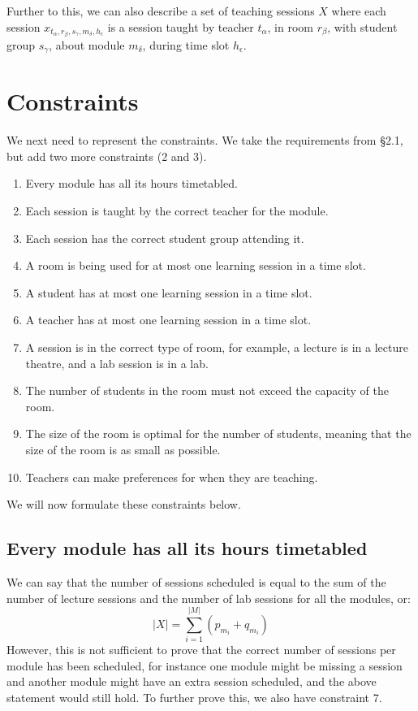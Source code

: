 \documentclass[a4paper, 12pt]{report}
\begin{document}
Further to this, we can also describe a set of teaching sessions \( X \) where 
each session \( x_{t_{\alpha},r_{\beta},s_{\gamma},m_{\delta},h_{\epsilon}} \) 
is a session taught by teacher \( t_{\alpha} \), in room \( r_{\beta} \), with 
student group \( s_{\gamma} \), about module \( m_{\delta} \), during time slot
\( h_{\epsilon} \).

\section{Constraints}

We next need to represent the constraints. We take the requirements from \S 2.1,
but add two more constraints (2 and 3).
\begin{enumerate}
	\item Every module has all its hours timetabled.
	\item Each session is taught by the correct teacher for the module.
	\item Each session has the correct student group attending it.
	\item A room is being used for at most one learning session in a time slot.
	\item A student has at most one learning session in a time slot.
	\item A teacher has at most one learning session in a time slot.
	\item A session is in the correct type of room, for example, a lecture is in 
		a lecture theatre, and a lab session is in a lab.
	\item The number of students in the room must not exceed the capacity of the
		room.
	\item The size of the room is optimal for the number of students, meaning 
		that the size of the room is as small as possible.
	\item Teachers can make preferences for when they are teaching.
\end{enumerate}
We will now formulate these constraints below.

\subsection{Every module has all its hours timetabled}

We can say that the number of sessions scheduled is equal to the sum of the 
number of lecture sessions and the number of lab sessions for all the modules, 
or:
\begin{equation*}
	\lvert X \rvert = \sum_{i=1}^{\lvert M \rvert} (p_{m_i} + q_{m_i})
\end{equation*}
However, this is not sufficient to prove that the correct number of sessions per
module has been scheduled, for instance one module might be missing a session 
and another module might have an extra session scheduled, and the above 
statement would still hold. To further prove this, we also have constraint 7.
\end{document}
